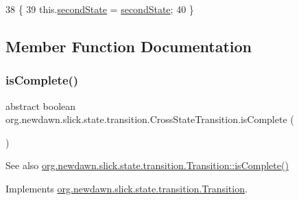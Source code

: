 \begin{DoxyCode}
38                                                        \{
39         this.\mbox{\hyperlink{classorg_1_1newdawn_1_1slick_1_1state_1_1transition_1_1_cross_state_transition_a75dc8f5366c67cb40b833672578fd7e5}{secondState}} = \mbox{\hyperlink{classorg_1_1newdawn_1_1slick_1_1state_1_1transition_1_1_cross_state_transition_a75dc8f5366c67cb40b833672578fd7e5}{secondState}};
40     \}
\end{DoxyCode}


\subsection{Member Function Documentation}
\mbox{\label{classorg_1_1newdawn_1_1slick_1_1state_1_1transition_1_1_cross_state_transition_a2a81c43dc051ee2290787a5a10ab2ac2}} 
\subsubsection{\texorpdfstring{is\+Complete()}{isComplete()}}
{\footnotesize\ttfamily abstract boolean org.\+newdawn.\+slick.\+state.\+transition.\+Cross\+State\+Transition.\+is\+Complete (\begin{DoxyParamCaption}{ }\end{DoxyParamCaption})\hspace{0.3cm}{\ttfamily [abstract]}}

\begin{DoxySeeAlso}{See also}
\mbox{\hyperlink{interfaceorg_1_1newdawn_1_1slick_1_1state_1_1transition_1_1_transition_af397d5185cf09c30c3f51d5021d63815}{org.\+newdawn.\+slick.\+state.\+transition.\+Transition\+::is\+Complete()}} 
\end{DoxySeeAlso}


Implements \mbox{\hyperlink{interfaceorg_1_1newdawn_1_1slick_1_1state_1_1transition_1_1_transition_af397d5185cf09c30c3f51d5021d63815}{org.\+newdawn.\+slick.\+state.\+transition.\+Transition}}.

\mbox{\label{classorg_1_1newdawn_1_1slick_1_1state_1_1transition_1_1_cross_state_transition_ad932e1984f648e582290937e9f1c880f}} 
